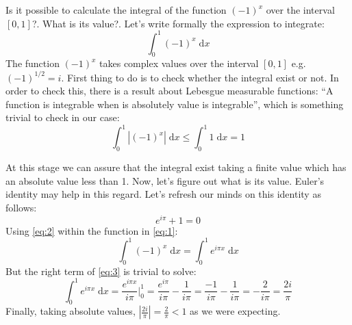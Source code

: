 \documentclass[12pt]{article}
\begin{document}
\maketitle
Is it possible to calculate the integral of the function $(-1)^x$ over the interval $[0,1]$?. What is its value?. Let's write formally the expression to integrate:
\begin{equation}
\int_0^1 (-1)^x\;\mathrm{d}x \label{eq:1}
\end{equation}
The function $(-1)^x$ takes complex values over the interval $[0,1]$ e.g. $(-1)^{1/2} = i$. First thing to do is to check whether the integral exist or not. In order to check this, there is a result about Lebesgue measurable functions: ``A function is integrable when is absolutely value is integrable'', which is something trivial to check in our case:
\begin{equation*}
\int_0^1 |(-1)^x| \;\mathrm{d}x \leq \int_0^1 1\;\mathrm{d}x = 1
\end{equation*}

At this stage we can assure that the integral exist taking a finite value which has an absolute value less than 1. Now, let's figure out what is its value. Euler's identity may help in this regard. Let's refresh our minds on this identity as follows:
\begin{equation}
e^{i \pi} + 1 = 0 \label{eq:2}
\end{equation}
Using \eqref{eq:2} within the function in \eqref{eq:1}:
\begin{equation}
\int_0^1 (-1)^x\;\mathrm{d}x = \int_0^1 e^{i \pi x}\;\mathrm{d}x \label{eq:3} 
\end{equation}
But the right term of \eqref{eq:3} is trivial to solve:
\begin{equation}
\int_0^1 e^{i \pi x}\;\mathrm{d}x =  \frac{e^{i \pi x}}{i \pi} \Biggr|_{0}^{1} = \frac{e^{i \pi}}{i \pi} - \frac{1}{i \pi} = \frac{-1}{i \pi} - \frac{1}{i \pi} = - \frac{2}{i \pi} = \frac{2 i}{\pi}  \label{eq:4} 
\end{equation}
Finally, taking absolute values, $|\frac{2 i}{\pi}| = \frac{2}{\pi} < 1$ as we were expecting.
\end{document}

